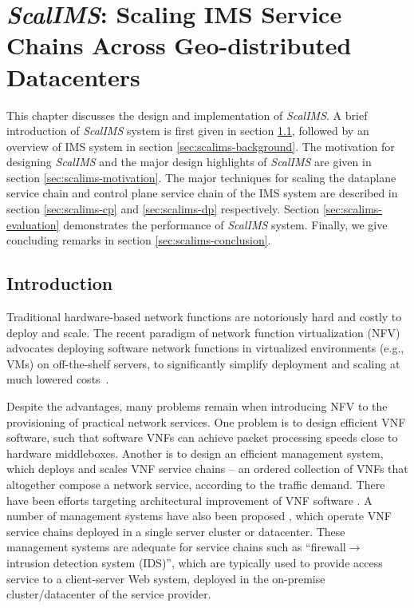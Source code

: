 \chapter {\textit{ScalIMS}: Scaling IMS Service Chains Across Geo-distributed Datacenters}
\label{ch:scalims}

This chapter discusses the design and implementation of \textit{ScalIMS}. A brief introduction of \textit{ScalIMS} system is first given in section \ref{sec:scalims-introduction}, followed by an overview of IMS system in section \ref{sec:scalims-background}. The motivation for designing \textit{ScalIMS} and the major design highlights of \textit{ScalIMS} are given in section \ref{sec:scalims-motivation}. The major techniques for scaling the dataplane service chain and control plane service chain of the IMS system are described in section \ref{sec:scalims-cp} and \ref{sec:scalims-dp} respectively. Section \ref{sec:scalims-evaluation} demonstrates the performance of \textit{ScalIMS} system. Finally, we give concluding remarks in section \ref{sec:scalims-conclusion}.

\section{Introduction} \label{sec:scalims-introduction}

Traditional hardware-based network functions are notoriously hard and costly to deploy and scale. The recent paradigm of network function virtualization (NFV) advocates deploying software network functions in virtualized environments (e.g., VMs) on off-the-shelf servers, to significantly simplify deployment and scaling at much lowered costs~\cite{nfv-website}.

Despite the advantages, many problems remain when introducing NFV to the provisioning of practical network services. %
 One problem is to design efficient VNF software, such that software VNFs can achieve packet processing speeds close to hardware middleboxes. Another is to design an efficient management system, which deploys and scales VNF service chains -- an ordered collection of VNFs that altogether compose a network service, according to the traffic demand. There have been efforts targeting architectural improvement of VNF software \cite{martins2014clickos}. A number of management systems have also been proposed \cite{palkar2015e2, gember2012stratos}, which operate VNF service chains deployed in a single server cluster or datacenter. These management systems are adequate for service chains such as ``firewall$\rightarrow$ intrusion detection system (IDS)'', %
 which are typically used to provide access service to a client-server Web system, %
  deployed in the on-premise cluster/datacenter of the service provider.


